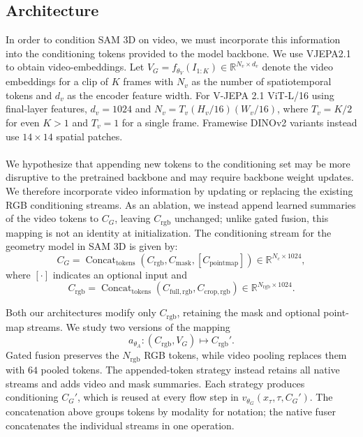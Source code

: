 \documentclass{article}
\begin{document}
\subsection{Architecture}
In order to condition SAM 3D on video, we must incorporate this information into the conditioning tokens provided to the model backbone. We use VJEPA2.1 \cite{vjepa21} to obtain video-embeddings. Let $V_G=f_{\theta_V} (I_{1:K})\in\mathbb{R}^{N_v\times d_v}$ denote the video embeddings for a clip of $K$ frames with $N_v$ as the number of spatiotemporal tokens and $d_v$ as the encoder feature width. For V-JEPA 2.1 ViT-L/16 using final-layer features, $d_v=1024$ and $N_v=T_v(H_v/16)(W_v/16)$, where $T_v=K/2$ for even $K>1$ and $T_v=1$ for a single frame. Framewise DINOv2 variants instead use $14\times14$ spatial patches.
\\ \\
We hypothesize that appending new tokens to the conditioning set may be more disruptive to the pretrained backbone and may require backbone weight updates. We therefore incorporate video information by updating or replacing the existing RGB conditioning streams. As an ablation, we instead append learned summaries of the video tokens to $C_G$, leaving $C_{\mathrm{rgb}}$ unchanged; unlike gated fusion, this mapping is not an identity at initialization. The conditioning stream for the geometry model in SAM 3D is given by:
\begin{equation}
    C_G=\operatorname{Concat}_{\mathrm{tokens}}\!
    \left(C_{\mathrm{rgb}},C_{\mathrm{mask}},[C_{\mathrm{pointmap}}]\right)
    \in\mathbb{R}^{N_c\times1024},
\end{equation}
where $[\cdot]$ indicates an optional input and
\begin{equation}
    C_{\mathrm{rgb}}=\operatorname{Concat}_{\mathrm{tokens}}\!
    \left(C_{\mathrm{full,rgb}},C_{\mathrm{crop,rgb}}\right)
    \in\mathbb{R}^{N_{\mathrm{rgb}}\times1024}.
\end{equation}

Both our architectures modify only $C_{\mathrm{rgb}}$, retaining the mask and optional point-map streams. We study two versions of the mapping
\begin{equation}
    a_{\theta_A}:(C_{\mathrm{rgb}},V_G)\longmapsto C_{\mathrm{rgb}}'.
\end{equation}
Gated fusion preserves the $N_{\mathrm{rgb}}$ RGB tokens, while video pooling replaces them with $64$ pooled tokens. The appended-token strategy instead retains all native streams and adds video and mask summaries. Each strategy produces conditioning $C_G'$, which is reused at every flow step in $v_{\theta_G}(x_\tau,\tau,C_G')$. The concatenation above groups tokens by modality for notation; the native fuser concatenates the individual streams in one operation.
\end{document}
